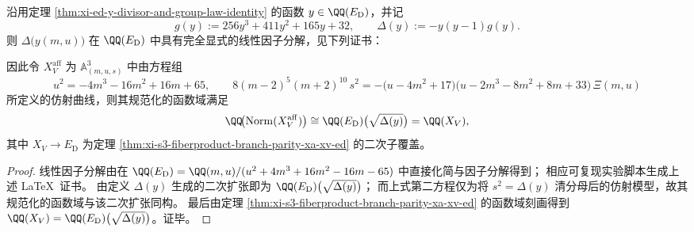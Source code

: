 \begin{theorem}\label{thm:xi-ed-discriminant-linear-factorization-and-xv-affine-model}
沿用定理 \ref{thm:xi-ed-y-divisor-and-group-law-identity} 的函数 \(y\in\QQ(E_{\mathrm D})\)，并记
\[
g(y):=256y^3+411y^2+165y+32,\qquad \Delta(y):=-y(y-1)g(y).
\]
则 \(\Delta\bigl(y(m,u)\bigr)\) 在 \(\QQ(E_{\mathrm D})\) 中具有完全显式的线性因子分解，见下列证书：

\par
因此令 \(X_V^{\mathrm{aff}}\) 为 \(\mathbb A^3_{(m,u,s)}\) 中由方程组
\[
u^2=-4m^3-16m^2+16m+65,
\qquad
8(m-2)^5(m+2)^{10}\,s^2
=-\bigl(u-4m^2+17\bigr)\bigl(u-2m^3-8m^2+8m+33\bigr)\,\Xi(m,u)
\]
所定义的仿射曲线，则其规范化的函数域满足
\[
\QQ\!\bigl(\operatorname{Norm}(X_V^{\mathrm{aff}})\bigr)
\cong
\QQ(E_{\mathrm D})\bigl(\sqrt{\Delta(y)}\bigr)
=\QQ(X_V),
\]
其中 \(X_V\to E_{\mathrm D}\) 为定理 \ref{thm:xi-s3-fiberproduct-branch-parity-xa-xv-ed} 的二次子覆盖。
\end{theorem}
\begin{proof}
线性因子分解由在 \(\QQ(E_{\mathrm D})=\QQ(m,u)/(u^2+4m^3+16m^2-16m-65)\) 中直接化简与因子分解得到；
相应可复现实验脚本生成上述 \LaTeX\ 证书。
由定义 \(\Delta(y)\) 生成的二次扩张即为 \(\QQ(E_{\mathrm D})\bigl(\sqrt{\Delta(y)}\bigr)\)；
而上式第二方程仅为将 \(s^2=\Delta(y)\) 清分母后的仿射模型，故其规范化的函数域与该二次扩张同构。
最后由定理 \ref{thm:xi-s3-fiberproduct-branch-parity-xa-xv-ed} 的函数域刻画得到 \(\QQ(X_V)=\QQ(E_{\mathrm D})\bigl(\sqrt{\Delta(y)}\bigr)\)。证毕。
\end{proof}



